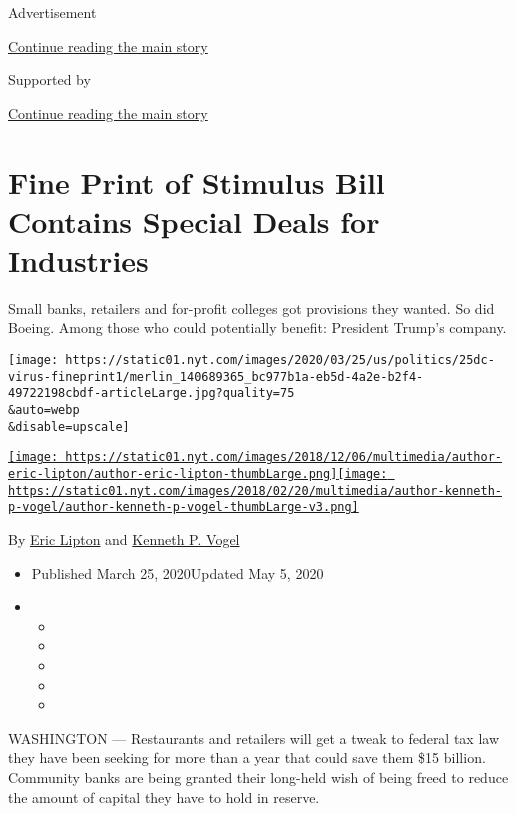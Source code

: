 Advertisement

\protect\hyperlink{after-top}{Continue reading the main story}

Supported by

\protect\hyperlink{after-sponsor}{Continue reading the main story}

\hypertarget{fine-print-of-stimulus-bill-contains-special-deals-for-industries}{%
\section{Fine Print of Stimulus Bill Contains Special Deals for
Industries}\label{fine-print-of-stimulus-bill-contains-special-deals-for-industries}}

Small banks, retailers and for-profit colleges got provisions they
wanted. So did Boeing. Among those who could potentially benefit:
President Trump's company.

\texttt{[image: https://static01.nyt.com/images/2020/03/25/us/politics/25dc-virus-fineprint1/merlin\_140689365\_bc977b1a-eb5d-4a2e-b2f4-49722198cbdf-articleLarge.jpg?quality=75\\\&auto=webp\\\&disable=upscale]}

\href{https://www.nytimes.com/by/eric-lipton}{\texttt{[image: https://static01.nyt.com/images/2018/12/06/multimedia/author-eric-lipton/author-eric-lipton-thumbLarge.png]}}\href{https://www.nytimes.com/by/kenneth-p-vogel}{\texttt{[image: https://static01.nyt.com/images/2018/02/20/multimedia/author-kenneth-p-vogel/author-kenneth-p-vogel-thumbLarge-v3.png]}}

By \href{https://www.nytimes.com/by/eric-lipton}{Eric Lipton} and
\href{https://www.nytimes.com/by/kenneth-p-vogel}{Kenneth P. Vogel}

\begin{itemize}
\item
  Published March 25, 2020Updated May 5, 2020
\item
  \begin{itemize}
  \item
  \item
  \item
  \item
  \item
  \end{itemize}
\end{itemize}

WASHINGTON --- Restaurants and retailers will get a tweak to federal tax
law they have been seeking for more than a year that could save them
\$15 billion. Community banks are being granted their long-held wish of
being freed to reduce the amount of capital they have to hold in
reserve.

